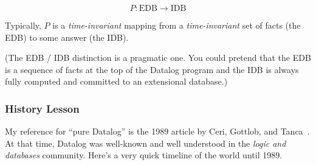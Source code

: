 \documentclass{article}
\begin{document}
\[ P : \mbox{EDB} \rightarrow \mbox{IDB} \]

Typically, $P$ is a \emph{time-invariant} mapping from a \emph{time-invariant} set of facts (the EDB) to some answer (the IDB).

(The EDB / IDB distinction is a pragmatic one. You could pretend that the EDB is a sequence of facts at the top of the Datalog program and the IDB is always fully computed and committed to an extensional database.)


\subsubsection*{History Lesson}

My reference for ``pure Datalog'' is the 1989 article by Ceri, Gottlob, and Tanca~\cite{cgt-ieee-1989}.
At that time, Datalog was well-known and well understood in the \emph{logic and databases} community.
Here's a very quick timeline of the world until 1989.
\end{document}
